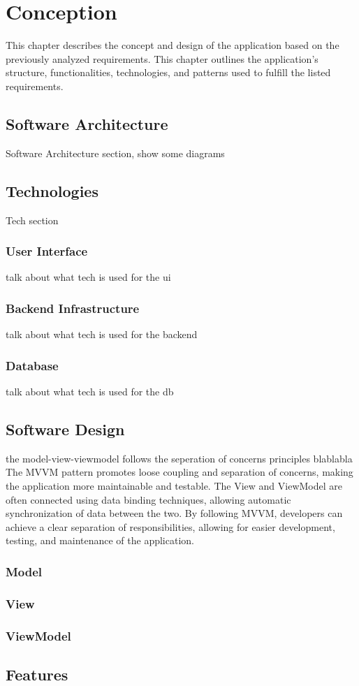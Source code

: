 \chapter{Conception}
This chapter describes the concept and design of the application based on the previously analyzed requirements. This chapter outlines the application's structure, functionalities, technologies, and patterns used to fulfill the listed requirements.



\section{Software Architecture}
Software Architecture section, show some diagrams

\section{Technologies}
Tech section
\subsection{User Interface}
talk about what tech is used for the ui
\subsection{Backend Infrastructure}
talk about what tech is used for the backend
\subsection{Database}
talk about what tech is used for the db


\section{Software Design}
the model-view-viewmodel follows the seperation of concerns principles blablabla
The MVVM pattern promotes loose coupling and separation of concerns, making the application more maintainable and testable. The View and ViewModel are often connected using data binding techniques, allowing automatic synchronization of data between the two.
By following MVVM, developers can achieve a clear separation of responsibilities, allowing for easier development, testing, and maintenance of the application.
\subsection{Model}
\subsection{View}
\subsection{ViewModel}

\section{Features}
